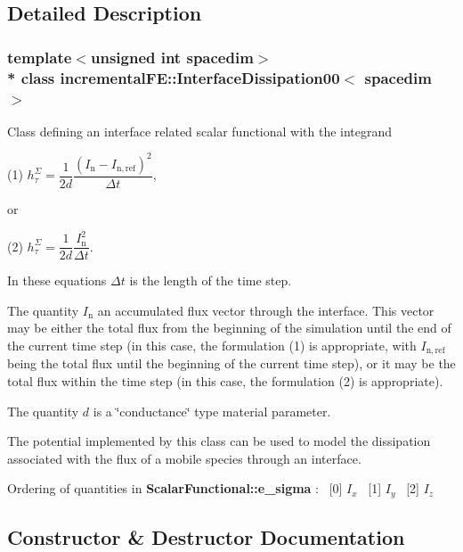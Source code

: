 \subsection{Detailed Description}
\subsubsection*{template$<$unsigned int spacedim$>$\\*
class incremental\+F\+E\+::\+Interface\+Dissipation00$<$ spacedim $>$}

Class defining an interface related scalar functional with the integrand

(1) $h^\Sigma_\tau = \dfrac{1}{2 d} \dfrac{(I_\mathrm{n}-I_\mathrm{n,ref})^2}{\Delta t}$,

or

(2) $h^\Sigma_\tau = \dfrac{1}{2 d} \dfrac{I_\mathrm{n}^2}{\Delta t}$.

In these equations $\Delta t$ is the length of the time step.

The quantity $I_\mathrm{n}$ an accumulated flux vector through the interface. This vector may be either the total flux from the beginning of the simulation until the end of the current time step (in this case, the formulation (1) is appropriate, with $I_\mathrm{n,ref}$ being the total flux until the beginning of the current time step), or it may be the total flux within the time step (in this case, the formulation (2) is appropriate).

The quantity $d$ is a \char`\"{}conductance\char`\"{} type material parameter.
\begin{DoxyItemize}
\item The potential implemented by this class can be used to model the dissipation associated with the flux of a mobile species through an interface.
\end{DoxyItemize}

Ordering of quantities in {\bf Scalar\+Functional\+::e\+\_\+sigma} \+:~\newline
\mbox{[}0\mbox{]} $I_x$~\newline
 \mbox{[}1\mbox{]} $I_y$~\newline
 \mbox{[}2\mbox{]} $I_z$~\newline
 

\subsection{Constructor \& Destructor Documentation}
